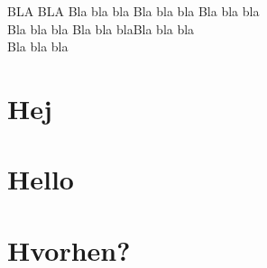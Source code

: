 \documentclass{article}
\begin{document}
\begin{titlepage}
    \vfill
    \clearpage\thispagestyle{empty}
    \centering
    {\Large BLA BLA }\vspace{0.5cm}
    {Bla bla bla}
    \vfill
    {Bla bla bla} Bla bla bla\\
    {Bla bla bla}
    \vfill
    {Bla bla bla}Bla bla bla\\
    {Bla bla bla\\
    }
    \vskip6cm
\end{titlepage}

\section*{Hej}
\section*{Hello}

\newpage
\section*{Hvorhen?}

\clearpage
\tableofcontents
\newpage


\newpage


\section{}

\newpage


\newpage

\end{document}
